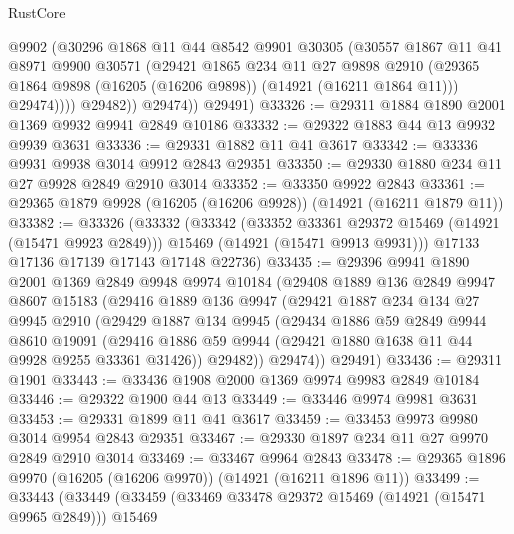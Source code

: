 \begin{lexlean}{RustCore}
\begin{coremodule}
                @9902
                (@30296
                  @1868
                  @11
                  @44
                  @8542
                  @9901
                  @30305
                  (@30557
                    @1867
                    @11
                    @41
                    @8971
                    @9900
                    @30571
                    (@29421
                      @1865
                      @234
                      @11
                      @27
                      @9898
                      @2910
                      (@29365 @1864 @9898 (@16205 (@16206 @9898)) (@14921 (@16211 @1864 @11)))
                      @29474))))
              @29482))
          @29474))
      @29491)
@33326 := @29311 @1884 @1890 @2001 @1369 @9932 @9941 @2849 @10186
@33332 := @29322 @1883 @44 @13 @9932 @9939 @3631
@33336 := @29331 @1882 @11 @41 @3617
@33342 := @33336 @9931 @9938 @3014 @9912 @2843 @29351
@33350 := @29330 @1880 @234 @11 @27 @9928 @2849 @2910 @3014
@33352 := @33350 @9922 @2843
@33361 := @29365 @1879 @9928 (@16205 (@16206 @9928)) (@14921 (@16211 @1879 @11))
@33382 := @33326
    (@33332
      (@33342
        (@33352 @33361 @29372 @15469 (@14921 (@15471 @9923 @2849)))
        @15469
        (@14921 (@15471 @9913 @9931)))
      @17133
      @17136
      @17139
      @17143
      @17148
      @22736)
@33435 := @29396
    @9941
    @1890
    @2001
    @1369
    @2849
    @9948
    @9974
    @10184
    (@29408
      @1889
      @136
      @2849
      @9947
      @8607
      @15183
      (@29416
        @1889
        @136
        @9947
        (@29421
          @1887
          @234
          @134
          @27
          @9945
          @2910
          (@29429
            @1887
            @134
            @9945
            (@29434
              @1886
              @59
              @2849
              @9944
              @8610
              @19091
              (@29416 @1886 @59 @9944 (@29421 @1880 @1638 @11 @44 @9928 @9255 @33361 @31426))
              @29482))
          @29474))
      @29491)
@33436 := @29311 @1901
@33443 := @33436 @1908 @2000 @1369 @9974 @9983 @2849 @10184
@33446 := @29322 @1900 @44 @13
@33449 := @33446 @9974 @9981 @3631
@33453 := @29331 @1899 @11 @41 @3617
@33459 := @33453 @9973 @9980 @3014 @9954 @2843 @29351
@33467 := @29330 @1897 @234 @11 @27 @9970 @2849 @2910 @3014
@33469 := @33467 @9964 @2843
@33478 := @29365 @1896 @9970 (@16205 (@16206 @9970)) (@14921 (@16211 @1896 @11))
@33499 := @33443
    (@33449
      (@33459
        (@33469 @33478 @29372 @15469 (@14921 (@15471 @9965 @2849)))
        @15469

\end{coremodule}
\end{lexlean}
